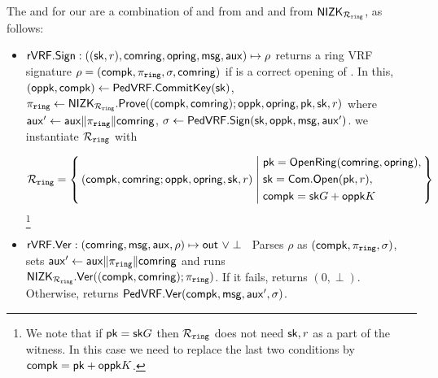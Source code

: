 \noindent The \Sign and \Verify for  our \rVRF are a combination of \Sign and \Verify from \PedVRF and
\Prove and \Verify from ${\mathsf{NIZK}}_{\mathcal{R}_{\mathtt{ring}}}$, as follows:
\def\tmpaux{\aux \doubleplus \piring \doubleplus \comring}
\def\tmpeprintaux{\eprint{\aux'}{\tmpaux}}
\def\tmpindent{\hspace*{5pt}}
\begin{itemize}
	
	\item ${\mathsf{rVRF}}.{\mathsf{Sign}} : ((\mathsf{sk},r),\mathsf{comring}, \mathsf{opring},\mathsf{msg},\mathsf{aux}) \mapsto \rho$
	returns a ring VRF signature $\rho = (\mathsf{compk},\pi_{\mathtt{ring}},\sigma, \mathsf{comring})$
	if \openring is a correct opening of \comring.  In this, $(\mathsf{oppk},\mathsf{compk}) \leftarrow {\ensuremath{\mathsf{PedVRF}}}.{\mathsf{CommitKey}}(\mathsf{sk})$,  $\pi_{\mathtt{ring}} \leftarrow {\ensuremath{\mathsf{NIZK}}}_{\mathcal{R}_{\mathtt{ring}}}.{\mathsf{Prove}}((\mathsf{compk},\mathsf{comring}); \mathsf{oppk},\mathsf{opring}, \mathsf{pk},\mathsf{sk},r)$ where  $\aux' \leftarrow \tmpaux$,  $\sigma \leftarrow {\ensuremath{\mathsf{PedVRF}}}.{\mathsf{Sign}}(\mathsf{sk},\mathsf{oppk},\mathsf{msg}, \mathsf{aux}')$.  we instantiate  $ \mathcal{R}_{\mathtt{ring}} $ with

	
	$$ \Rring = \Setst{ (\compk,\comring ;\openpk,\openring,\sk,r) }{
		\begin{aligned}
			&	\pk = \OpenRing(\comring,\openring), \\
			& 	\sk = \mathsf{Com}.\mathsf{Open}(\pk,r), \\
			& 	\compk = \sk \genG + \openpk \genB
		\end{aligned}	
	}$$
	\footnote{We note that if $ \mathsf{pk} = \mathsf{sk}G $ then $ \mathcal{R}_{\mathtt{ring}} $ does not need $ \mathsf{sk},r $ as a part of the witness. In this case we need to replace the last two conditions by $ \mathsf{compk} = \mathsf{pk} + \mathsf{oppk} K $.}
	\item ${\mathsf{rVRF}}.{\mathsf{Ver}} : (\mathsf{comring},\mathsf{msg},\mathsf{aux},\rho) \mapsto {\ensuremath{\mathsf{out}}} \,\, \lor \perp$ \,
	Parses $\rho$ as $(\mathsf{compk},\pi_{\mathtt{ring}},\sigma)$,  sets $\aux' \leftarrow \tmpaux$ and runs ${\mathsf{NIZK}}_{\mathcal{R}_{\mathtt{ring}}}.{\mathsf{Ver}}((\mathsf{compk},\mathsf{comring}); \pi_{\mathtt{ring}})$.
	If it fails, returns $ (0,\perp) $. Otherwise, returns ${\mathsf{PedVRF}}.{\mathsf{Ver}}(\mathsf{compk},\mathsf{msg}, \mathsf{aux}', \sigma)$.
\end{itemize}










